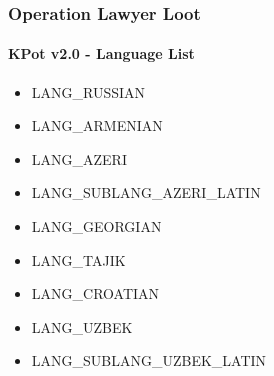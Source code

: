 \documentclass[aspectratio=169]{beamer}
\begin{document}
{
\begin{frame}
  \frametitle{Operation Lawyer Loot}
  \framesubtitle{KPot v2.0 - Language List}
  \begin{itemize}
  \item{LANG\_RUSSIAN}
  \item{LANG\_ARMENIAN}
  \item{LANG\_AZERI}
  \item{LANG\_SUBLANG\_AZERI\_LATIN}
  \item{LANG\_GEORGIAN}
  \item{LANG\_TAJIK}
  \item{LANG\_CROATIAN}
  \item{LANG\_UZBEK}
  \item{LANG\_SUBLANG\_UZBEK\_LATIN}
  \end{itemize}
\end{frame}
}
\end{document}
